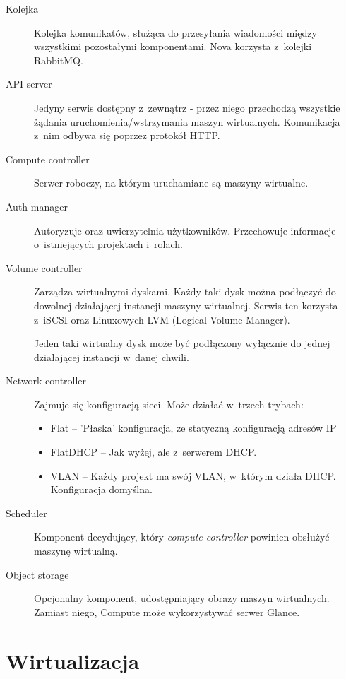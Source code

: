 \begin{description}

\item[Kolejka]
Kolejka komunikatów, służąca do przesyłania wiadomości między wszystkimi pozostałymi komponentami. Nova korzysta z~kolejki RabbitMQ.

\item[API server]
Jedyny serwis dostępny z~zewnątrz - przez niego przechodzą wszystkie żądania uruchomienia/wstrzymania maszyn wirtualnych. Komunikacja z~nim odbywa się poprzez protokół HTTP. 

\item[Compute controller]
Serwer roboczy, na którym uruchamiane są maszyny wirtualne.

\item[Auth manager]
Autoryzuje oraz uwierzytelnia użytkowników. Przechowuje informacje o~istniejących projektach i~rolach.

\item[Volume controller]
Zarządza wirtualnymi dyskami. Każdy taki dysk można podłączyć do dowolnej działającej instancji maszyny wirtualnej. Serwis ten korzysta z~iSCSI oraz Linuxowych LVM (Logical Volume Manager).

Jeden taki wirtualny dysk może być podłączony wyłącznie do jednej działającej instancji w~danej chwili.

\item[Network controller]
Zajmuje się konfiguracją sieci. Może działać w~trzech trybach:
\begin{itemize}
\item Flat -- 'Płaska' konfiguracja, ze statyczną konfiguracją adresów IP
\item FlatDHCP -- Jak wyżej, ale z~serwerem DHCP.
\item VLAN -- Każdy projekt ma swój VLAN, w~którym działa DHCP. Konfiguracja domyślna.
\end{itemize}

\item[Scheduler]
Komponent decydujący, który {\it compute controller} powinien obsłużyć maszynę wirtualną.

\item[Object storage]
Opcjonalny komponent, udostępniający obrazy maszyn wirtualnych. Zamiast niego, Compute może wykorzystywać serwer Glance.

\end{description}

\section{Wirtualizacja}


